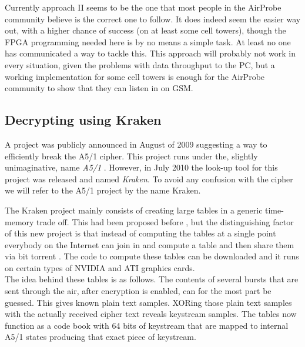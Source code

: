 \documentclass[a4paper,11pt]{llncs}
\begin{document}
Currently approach II seems to be the one that most people in the AirProbe community believe is the correct one to follow. It does indeed seem the easier way out, with a higher chance of success (on at least some cell towers), though the FPGA programming needed here is by no means a simple task. At least no one has communicated a way to tackle this. This approach will probably not work in every situation, given the problems with data throughput to the PC, but a working implementation for some cell towers is enough for the AirProbe community to show that they can listen in on GSM.\\

\subsection{Decrypting using Kraken}\label{sec:prac_dec}
A project was publicly announced in August of 2009 suggesting a way to efficiently break the A5/1 cipher. This project runs under the, slightly unimaginative, name \textit{A5/1} \cite{url:a51}. However, in July 2010 the look-up tool for this project was released and named \textit{Kraken}. To avoid any confusion with the cipher we will refer to the A5/1 project by the name Kraken.

The Kraken project mainly consists of creating large tables in a generic time-memory trade off. This had been proposed before \cite{hulton:A51}, but the distinguishing factor of this new project is that instead of computing the tables at a single point everybody on the Internet can join in and compute a table and then share them via bit torrent \cite{url:torrents}. The code to compute these tables can be downloaded and it runs on certain types of NVIDIA and ATI graphics cards.\\

The idea behind these tables is as follows. The contents of several bursts that are sent through the air, after encryption is enabled, can for the most part be guessed. This gives known plain text samples. XORing those plain text samples with the actually received cipher text reveals keystream samples. The tables now function as a code book with 64 bits of keystream that are mapped to internal A5/1 states producing that exact piece of keystream.
\end{document}
